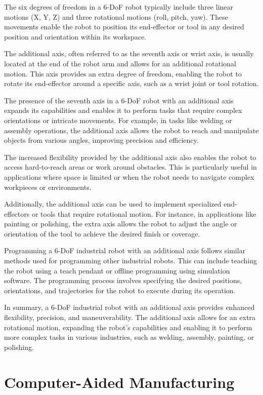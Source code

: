 The six degrees of freedom in a 6-DoF robot typically include three linear motions (X, Y, Z) and three rotational motions (roll, pitch, yaw). These movements enable the robot to position its end-effector or tool in any desired position and orientation within its workspace.

The additional axis, often referred to as the seventh axis or wrist axis, is usually located at the end of the robot arm and allows for an additional rotational motion. This axis provides an extra degree of freedom, enabling the robot to rotate its end-effector around a specific axis, such as a wrist joint or tool rotation.

The presence of the seventh axis in a 6-DoF robot with an additional axis expands its capabilities and enables it to perform tasks that require complex orientations or intricate movements. For example, in tasks like welding or assembly operations, the additional axis allows the robot to reach and manipulate objects from various angles, improving precision and efficiency.

The increased flexibility provided by the additional axis also enables the robot to access hard-to-reach areas or work around obstacles. This is particularly useful in applications where space is limited or when the robot needs to navigate complex workpieces or environments.

Additionally, the additional axis can be used to implement specialized end-effectors or tools that require rotational motion. For instance, in applications like painting or polishing, the extra axis allows the robot to adjust the angle or orientation of the tool to achieve the desired finish or coverage.

Programming a 6-DoF industrial robot with an additional axis follows similar methods used for programming other industrial robots. This can include teaching the robot using a teach pendant or offline programming using simulation software. The programming process involves specifying the desired positions, orientations, and trajectories for the robot to execute during its operation.

In summary, a 6-DoF industrial robot with an additional axis provides enhanced flexibility, precision, and maneuverability. The additional axis allows for an extra rotational motion, expanding the robot's capabilities and enabling it to perform more complex tasks in various industries, such as welding, assembly, painting, or polishing.

\section{Computer-Aided Manufacturing}\label{CAMmain}
